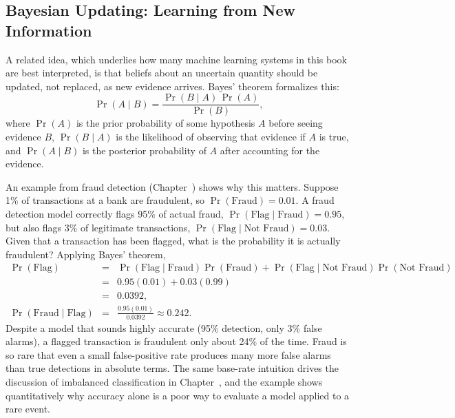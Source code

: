 \documentclass[../ai_in_finance]{subfiles}
\begin{document}
\subsection{Bayesian Updating: Learning from New Information}
\label{sec:intro-bayesian-updating}

A related idea, which underlies how many machine learning systems in this book are best interpreted, is that beliefs about an uncertain quantity should be updated, not replaced, as new evidence arrives. Bayes' theorem formalizes this:
\begin{equation}
\Pr(A \mid B) = \frac{\Pr(B \mid A)\,\Pr(A)}{\Pr(B)},\label{eq:intro-bayes}
\end{equation}
where $\Pr(A)$ is the prior probability of some hypothesis $A$ before seeing evidence $B$, $\Pr(B\mid A)$ is the likelihood of observing that evidence if $A$ is true, and $\Pr(A\mid B)$ is the posterior probability of $A$ after accounting for the evidence.

An example from fraud detection (Chapter~) shows why this matters. Suppose 1\% of transactions at a bank are fraudulent, so $\Pr(\text{Fraud}) = 0.01$. A fraud detection model correctly flags 95\% of actual fraud, $\Pr(\text{Flag}\mid\text{Fraud}) = 0.95$, but also flags 3\% of legitimate transactions, $\Pr(\text{Flag}\mid\text{Not Fraud}) = 0.03$. Given that a transaction has been flagged, what is the probability it is actually fraudulent? Applying Bayes' theorem,
\begin{eqnarray*}
\Pr(\text{Flag}) &=& \Pr(\text{Flag}\mid\text{Fraud})\Pr(\text{Fraud}) + \Pr(\text{Flag}\mid\text{Not Fraud})\Pr(\text{Not Fraud})\\
& =& 0.95(0.01) + 0.03(0.99) \\
&=& 0.0392, \\
\Pr(\text{Fraud}\mid\text{Flag}) &=& \frac{0.95(0.01)}{0.0392} \approx 0.242.
\end{eqnarray*}
Despite a model that sounds highly accurate (95\% detection, only 3\% false alarms), a flagged transaction is fraudulent only about 24\% of the time. Fraud is so rare that even a small false-positive rate produces many more false alarms than true detections in absolute terms. The same base-rate intuition drives the discussion of imbalanced classification in Chapter~, and the example shows quantitatively why accuracy alone is a poor way to evaluate a model applied to a rare event.
\end{document}
